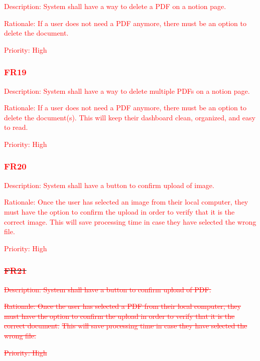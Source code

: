 \documentclass[12pt, titlepage]{article}
\begin{document}
\begin{description}
	\item \textcolor{red}{Description: System shall have a way to delete a PDF on a notion page.}
	\item \textcolor{red}{Rationale: If a user does not need a PDF anymore, there must be an option to delete the document.}
	\item \textcolor{red}{Priority: High}
\end{description}

\subsubsection{\textcolor{red}{FR19}}

\begin{description}
	\item \textcolor{red}{Description: System shall have a way to delete multiple PDFs on a notion page.}
	\item \textcolor{red}{Rationale: If a user does not need a PDF anymore, there must be an option to delete the document(s). This will keep their dashboard clean, organized, and easy to read.}
	\item \textcolor{red}{Priority: High}
\end{description}

\subsubsection{\textcolor{red}{FR20}}

\begin{description}
	\item \textcolor{red}{Description: System shall have a button to confirm upload of image.}
	\item \textcolor{red}{Rationale: Once the user has selected an image from their local computer, they must have the option to confirm the upload in order to verify that it is the correct image. This will save processing time in case they have selected the wrong file.}
	\item \textcolor{red}{Priority: High}
\end{description}

\subsubsection{\sout{\textcolor{red}{FR21}}}

\begin{description}
	\item \textcolor{red}{\sout{Description: System shall have a button to confirm upload of PDF.}}
	\item \textcolor{red}{\sout{Rationale: Once the user has selected a PDF from their local computer, they} 
  \sout{must have the option to confirm the upload in order to verify that it is the correct document.} 
  \sout{This will save processing time in case they have selected the wrong file.}}
	\item \textcolor{red}{\sout{Priority: High}}
\end{description}
\end{document}
